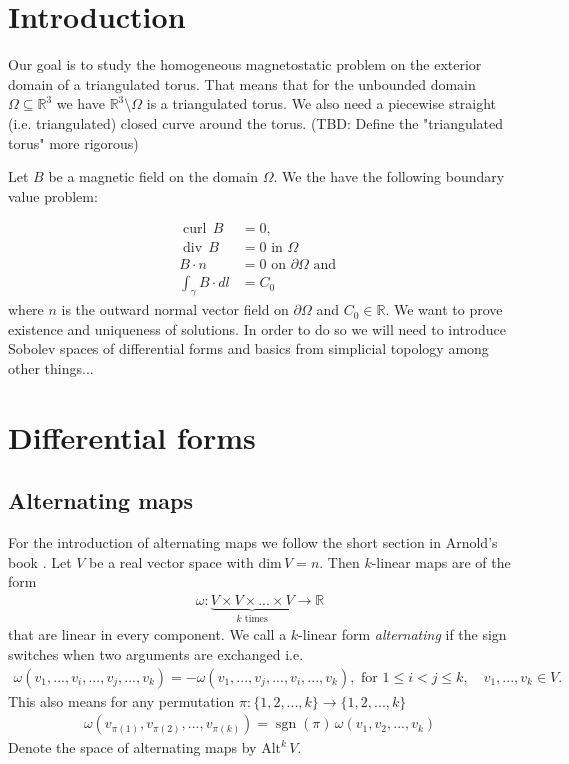 \documentclass[12pt,a4paper]{article}
\numberwithin{equation}{subsection}
\numberwithin{lemma}{subsection}
\theoremstyle{definition}
\DeclareMathOperator{\curl}{curl}
\DeclareMathOperator{\diver}{div}
\DeclareMathOperator{\sgn}{sgn}
\newcommand{\real}{\mathbb{R}}
\begin{document}
\section{Introduction}
Our goal is to study the homogeneous magnetostatic problem on the exterior 
domain of a triangulated torus. That means 
that for the unbounded domain  $\Omega \subseteq \real^3$ we have
$\real^3 \setminus \Omega$ is a triangulated torus. We also need a 
piecewise straight (i.e. triangulated) closed curve around the torus.
{\color{red} (TBD: Define the "triangulated torus" more rigorous)}

Let $B$ be a magnetic field on the domain $\Omega$.
We the have the following boundary value problem:

\begin{align}
    \curl \, B &= 0, \\ 
    \diver \, B  &= 0 \text{ in } \Omega \\
    B \cdot n &= 0 \text{ on } \partial \Omega \text{ and }\\
    \int_\gamma B \cdot dl &= C_0
\end{align}
where $n$ is the outward normal vector field on $\partial \Omega$ and 
$C_0 \in \real$. We want to prove existence and uniqueness of 
solutions. In order to do so we will need to introduce Sobolev spaces of 
differential forms and basics from
simplicial topology {\color{red} among other things...}

\section{Differential forms}


\subsection{Alternating maps}

For the introduction of alternating maps we follow
the short section in Arnold's book
\cite[Sec. 6.1.]{arnold}.
Let $V$ be a real vector space with $\text{dim}\,V = n$.
Then $k$-linear maps are of the form
\begin{align*}
    \omega: \underbrace{V \times V \times ... \times V}_{k \text{ times}}
    \rightarrow \real
\end{align*}
that are linear in every component. We call a $k$-linear form 
\textit{alternating} if the sign switches when two arguments are exchanged i.e.
\begin{align*}
    \omega(v_1,...,v_i,...,v_j,...,v_k)
    = - \omega(v_1,...,v_j,...,v_i,...,v_k), \text{ for } 1\leq i < j \leq k,
    \quad v_1,...,v_k \in V.
\end{align*}
This also means for any permutation 
$\pi: \{1,2,...,k\} \rightarrow \{1,2,...,k\}$
\begin{align*}
    \omega(v_{\pi(1)},v_{\pi(2)},...,v_{\pi(k)})
    = \sgn(\pi)\, \omega(v_1, v_2,..., v_k)
\end{align*}
Denote the space of alternating maps by $\text{Alt}^k\,V$.
\end{document}

